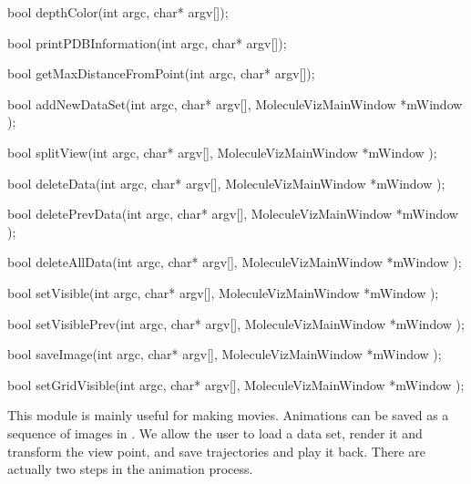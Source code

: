 \textcolor{BrickRed}{bool} depthColor(\textcolor{BrickRed}{int}
argc, \textcolor{BrickRed}{char*} argv[]);

\textcolor{BrickRed}{bool}
printPDBInformation(\textcolor{BrickRed}{int} argc,
\textcolor{BrickRed}{char*} argv[]);

\textcolor{BrickRed}{bool}
getMaxDistanceFromPoint(\textcolor{BrickRed}{int} argc,
\textcolor{BrickRed}{char*} argv[]);

\textcolor{BrickRed}{bool} addNewDataSet(\textcolor{BrickRed}{int}
argc, \textcolor{BrickRed}{char*} argv[],
\textcolor{BrickRed}{MoleculeVizMainWindow} *mWindow );

\textcolor{BrickRed}{bool} splitView(\textcolor{BrickRed}{int} argc,
\textcolor{BrickRed}{char*} argv[],
\textcolor{BrickRed}{MoleculeVizMainWindow} *mWindow );

\textcolor{BrickRed}{bool} deleteData(\textcolor{BrickRed}{int}
argc, \textcolor{BrickRed}{char*} argv[],
\textcolor{BrickRed}{MoleculeVizMainWindow} *mWindow );


\textcolor{BrickRed}{bool} deletePrevData(\textcolor{BrickRed}{int}
argc, \textcolor{BrickRed}{char*} argv[],
\textcolor{BrickRed}{MoleculeVizMainWindow} *mWindow );


\textcolor{BrickRed}{bool} deleteAllData(\textcolor{BrickRed}{int}
argc, \textcolor{BrickRed}{char*} argv[],
\textcolor{BrickRed}{MoleculeVizMainWindow} *mWindow );


\textcolor{BrickRed}{bool} setVisible(\textcolor{BrickRed}{int}
argc, \textcolor{BrickRed}{char*} argv[],
\textcolor{BrickRed}{MoleculeVizMainWindow} *mWindow );


\textcolor{BrickRed}{bool} setVisiblePrev(\textcolor{BrickRed}{int}
argc, \textcolor{BrickRed}{char*} argv[],
\textcolor{BrickRed}{MoleculeVizMainWindow} *mWindow );


\textcolor{BrickRed}{bool} saveImage(\textcolor{BrickRed}{int} argc,
\textcolor{BrickRed}{char*} argv[],
\textcolor{BrickRed}{MoleculeVizMainWindow} *mWindow );


\textcolor{BrickRed}{bool} setGridVisible(\textcolor{BrickRed}{int}
argc, \textcolor{BrickRed}{char*} argv[],
\textcolor{BrickRed}{MoleculeVizMainWindow} *mWindow );




This module is mainly useful for making movies. Animations can be
saved as a sequence of images in \TexMol. We allow the user to load
a data set, render it and transform the view point, and save
trajectories and play it back. There are actually two steps in the
animation process.

